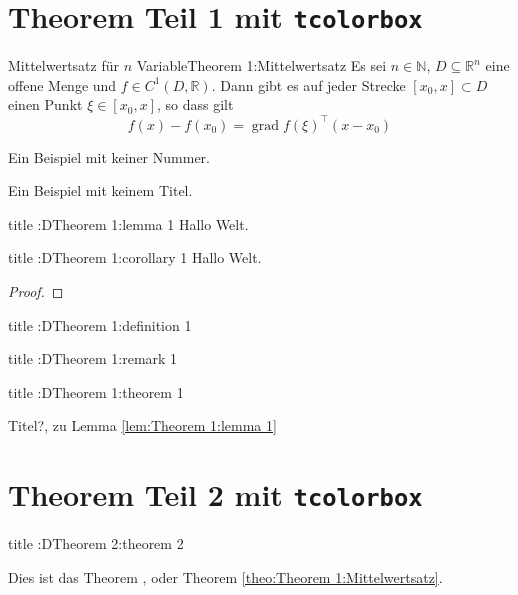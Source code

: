 \chapter{Theorem Teil 1 mit \texttt{tcolorbox}}%
\label{chap:Theorem 1}%

\lipsum[1-1]%
\begin{theorem}{Mittelwertsatz f\"{u}r $n$ Variable}{Theorem 1:Mittelwertsatz}%
	Es sei $n\in\mathbb{N}$, $D\subseteq\mathbb{R}^n$ eine offene Menge und $f\in C^{1}(D,\mathbb{R})$. Dann gibt es auf jeder Strecke $[x_0,x]\subset D$ einen Punkt $\xi\in[x_0,x]$, so dass gilt%
	\begin{equation*}%
	f(x)-f(x_0) = \operatorname{grad} f(\xi)^{\top}(x-x_0)%
	\end{equation*}%
\end{theorem}%
\begin{theorem*}{}{}%
	Ein Beispiel mit keiner Nummer.%
\end{theorem*}%
\begin{theorem}{}{}%
	Ein Beispiel mit keinem Titel.%
\end{theorem}%
\begin{lemma}{title :D}{Theorem 1:lemma 1}%
	Hallo Welt.
\end{lemma}%
\begin{corollary}{title :D}{Theorem 1:corollary 1}%
	Hallo Welt.
\end{corollary}%
\begin{proof}{}{}%
	\lipsum[1-3]
\end{proof}

\begin{definition}{title :D}{Theorem 1:definition 1}%
	\lipsum[1-1]
\end{definition}%
\begin{remark}{title :D}{Theorem 1:remark 1}%
	\lipsum[1-1]
\end{remark}%

\begin{theorem}{title :D}{Theorem 1:theorem 1}%
	\lipsum[1-1]
\end{theorem}%
\begin{proof*}{Titel?, zu Lemma \ref{lem:Theorem 1:lemma 1}}%
	\lipsum[1-1]
\end{proof*}

\chapter{Theorem Teil 2 mit \texttt{tcolorbox}}%
\label{chap:Theorem 2}%
\begin{theorem}{title :D}{Theorem 2:theorem 2}%
	\lipsum[1-1]
\end{theorem}%
Dies ist das Theorem , oder Theorem \ref{theo:Theorem 1:Mittelwertsatz}. \lipsum[1-1]%
\newpage%
\layout%
\newpage%
